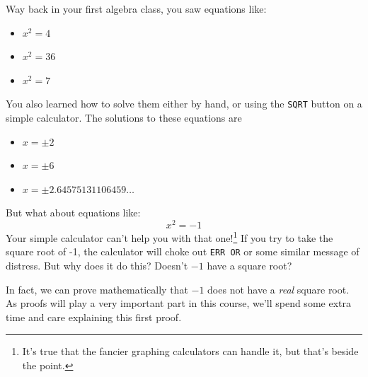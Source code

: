 Way back in your first algebra class, you saw equations like:
\begin{itemize}
\item $x^2 = 4$
\item $x^2 = 36$
\item $x^2 = 7$

\end{itemize}
You also learned how to solve them either by hand, or using the \texttt{SQRT} button on a simple calculator. The solutions to these equations are
\begin{itemize}
\item $x = \pm 2$
\item $x = \pm 6$
\item $x = \pm 2.64575131106459\ldots$
\end{itemize}
 But what about equations like:
\[x^2 = -1 \]
Your simple calculator can't help you with that one!\footnote{It's true that the fancier graphing calculators can handle it, but that's beside the point.}  If you try to take the square root of -1, the calculator will choke out \texttt{ERR OR} or some similar message of distress.  But why does it do this? Doesn't $-1$ have a square root? 

In fact, we can prove mathematically that $-1$ does not have a \emph{real} square root. As proofs will play a very important part in this course, we'll spend some extra time and care explaining this first proof.

